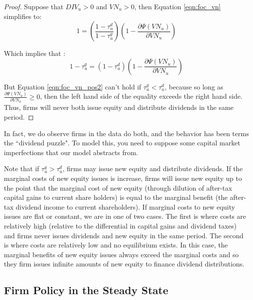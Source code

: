 \begin{proof}
Suppose that $DIV_{u}>0$ and $VN_{u}>0$, then Equation \ref{eqn:foc_vn} simplifies to:
 \begin{equation}
\label{eqn:foc_vn_pos}
 1 = \left(\frac{1-\tau^{d}_{u}}{1-\tau^{g}_{u}}\right)\left(1-\frac{\partial \Psi(VN_{u})}{\partial VN_{u}}\right) 
 \end{equation}
 
Which implies that :
  \begin{equation}
  \label{eqn:foc_vn_pos2}
 1-\tau^{g}_{u} = (1-\tau^{d}_{u})\left(1-\frac{\partial \Psi(VN_{u})}{\partial VN_{u}}\right) 
 \end{equation}


But Equation \ref{eqn:foc_vn_pos2} can't hold if $\tau^{g}_{u}<\tau^{d}_{u}$, because so long as $\frac{\partial \Psi(VN_{u})}{\partial VN_{u}}\geq0$, then the left hand side of the equality exceeds the right hand side.  Thus, firms will never both issue equity and distribute dividends in the same period.
\end{proof}

In fact, we do observe firms in the data do both, and the behavior has been terms the ``dividend puzzle".  To model this, you need to suppose some capital market imperfections that our model abstracts from.  

Note that if $\tau^{g}_{u}>\tau^{d}_{u}$, firms may issue new equity and distribute dividends.  If the marginal costs of new equity issues is increase, firms will issue new equity up to the point that the marginal cost of new equity (through dilution of after-tax capital gains to current share holders) is equal to the marginal benefit (the after-tax dividend income to current shareholders).  If marginal costs to new equity issues are flat or constant, we are in one of two cases.  The first is where costs are relatively high (relative to the differential in capital gains and dividend taxes) and firms never issues dividends and new equity in the same period.  The second is where costs are relatively low and no equilibrium exists.  In this case, the marginal benefits of new equity issues always exceed the marginal costs and so they firm issues infinite amounts of new equity to finance dividend distributions.




\subsection{Firm Policy in the Steady State}

